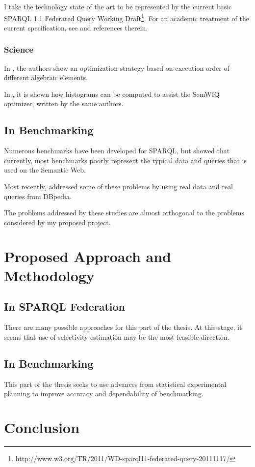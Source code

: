 \documentclass{llncs}
\begin{document}
I take the technology state of the art to be represented by the
current basic SPARQL 1.1 Federated Query Working
Draft\footnote{http://www.w3.org/TR/2011/WD-sparql11-federated-query-20111117/}. For
an academic treatment of the current specification, see
\cite{springerlink:10.1007/978-3-642-21064-8_1} and references therein.

\subsubsection{Science}

In \cite{springerlink:10.1007/978-3-642-21064-8_1}, the authors show
an optimization strategy based on execution order of different
algebraic elements. %

In \cite{5337556}, it is shown how histograms can be computed to
assist the SemWIQ optimizer, written by the same authors.

\subsection{In Benchmarking}

Numerous benchmarks have been developed for SPARQL, but
\cite{Duan:2011:AOC:1989323.1989340} showed that currently, most
benchmarks poorly represent the typical data and queries that is used
on the Semantic Web.

Most recently, \cite{mxro:Morsey2011DBpedia} addressed some of these
problems by using real data and real queries from DBpedia.

The problems addressed by these studies are almost orthogonal to the
problems considered by my proposed project.


\section{Proposed Approach and Methodology}

\subsection{In SPARQL Federation}

There are many possible approaches for this part of the thesis. At
this stage, it seems that use of selectivity estimation may be the
most feasible direction.

\subsection{In Benchmarking}

This part of the thesis seeks to use advances from statistical
experimental planning to improve accuracy and dependability of benchmarking.

\section{Conclusion}
\end{document}

